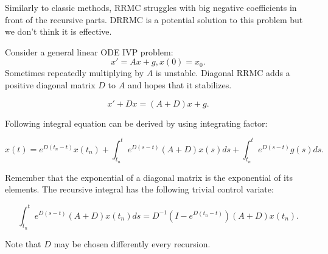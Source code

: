 \documentclass[a4paper,12pt]{article}
\begin{document}
Similarly to classic methods, RRMC struggles with big negative coefficients in front
of the recursive parts. DRRMC is a potential solution to this problem but we don't think
it is effective.

\begin{definition}[DRRMC]
    Consider a general linear ODE IVP problem:
    \begin{equation}
        x' = Ax+g, x(0)= x_{0}.
    \end{equation}
    Sometimes repeatedly multiplying by $A$ is unstable.
    Diagonal RRMC adds a positive diagonal matrix $D$
    to $A$ and hopes that it stabilizes.

    \begin{equation}
        x' + Dx = (A+D)x+g.
    \end{equation}

    Following integral equation can be derived by using integrating factor:

    \begin{equation}
        x(t)= e^{D(t_{n}-t)}x(t_{n}) + \int_{t_{n}}^{t} e^{D(s-t)}(A+D)x(s)ds+\int_{t_{n}}^{t} e^{D(s-t)}g(s)ds.
    \end{equation}

    Remember that the exponential of a diagonal matrix is the exponential of its elements.
    The recursive integral has the following trivial control variate:

    \begin{equation}
        \int_{t_{n}}^{t}  e^{D(s-t)}(A+D)x(t_{n})ds = D^{-1}(I-e^{D(t_{n}-t)})(A+D)x(t_{n}).
    \end{equation}

    Note that $D$ may be chosen differently every recursion.
\end{definition}



\end{document}
